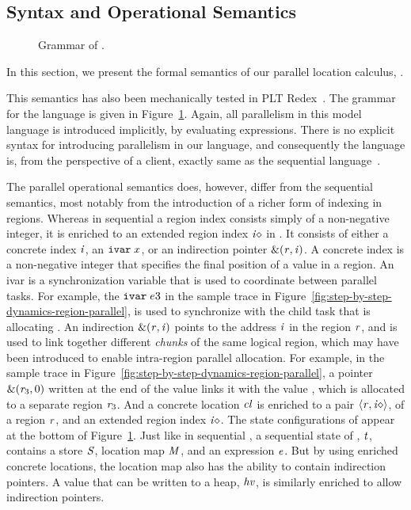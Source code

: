 \documentclass[acmsmall,acmthm=false,nonacm]{acmart}
\theoremstyle{straighttext0}
\theoremstyle{straighttext}
\newcommand{\Figref}[1]{Figure~\ref{#1}}
\begin{document}
\subsection{Syntax and Operational Semantics}
\label{subsec:region-parallel-semantics}

\begin{figure}
  \small
  
  
  \normalsize
  \caption{Grammar of \rparcalc{}.}  
  \label{fig:opergram}
\end{figure}

In this section, we present the formal semantics of our parallel
location calculus, \rparcalc{}. {This semantics has also been mechanically tested in PLT
  Redex~\cite{redex}.
%
The grammar for the language is given in \Figref{fig:opergram}.
%
Again, all parallelism in this model language is introduced implicitly, by
evaluating  expressions.
%
There is no explicit syntax for introducing parallelism in our
language, and consequently the language is,
from the perspective of a client, exactly same as the
sequential language~\cite{LoCal}.


The parallel operational semantics does, however, differ from the
sequential semantics, most notably from the introduction of a richer
form of indexing in regions.
%
Whereas in sequential \seqcalc{} a region index consists simply of a non-negative integer,
it is enriched to an extended region index $\mathit{i}\diamond$ in \rparcalc{}.
%
It consists of either a concrete index
$\mathit{i}$, an $\texttt{ivar}\; x$, or an indirection pointer
$\text{\&}(\mathit{r},\mathit{i})$.
%
A concrete index is a non-negative integer that specifies the
final position of a value in a region.
%
An ivar is a synchronization variable that is used to coordinate between parallel tasks.
%
For example, the $\texttt{ivar}\; e3$ in the sample
trace in \Figref{fig:step-by-step-dynamics-region-parallel}, is used
to synchronize with the child task that is allocating .
%
An indirection $\text{\&}(\mathit{r},\mathit{i})$ points
to the address $\mathit{i}$ in the region $\mathit{r}$,
and is used to link together different \emph{chunks} of the same logical region,
which may have been introduced to enable intra-region parallel allocation.
%
For example, in the sample
trace in \Figref{fig:step-by-step-dynamics-region-parallel}, a pointer
$\text{\&}(\mathit{r}_3,0)$ written at the end of the value 
links it with the value , which is allocated to a separate region $\mathit{r}_3$.
%
And a concrete location $\mathit{cl}$ is enriched to a pair
$\langle \mathit{r}, \mathit{i}\diamond \rangle ^{}$,
of a region $\mathit{r}$,
and an extended region index $\mathit{i}\diamond$.
%
The state configurations of \rparcalc{} appear at the bottom of
\Figref{fig:opergram}.
%
Just like in sequential \seqcalc{}, a sequential state of
\rparcalc{}, $\mathit{t}$, contains a store $\mathit{S}$, location map $\mathit{M}$, and an
expression $\mathit{e}$.
%
But by using enriched concrete locations,
the location map also has the ability to contain indirection pointers.
%
A value that can be written to a heap, $\mathit{hv}$, is
similarly enriched to allow indirection pointers.


}
\end{document}

